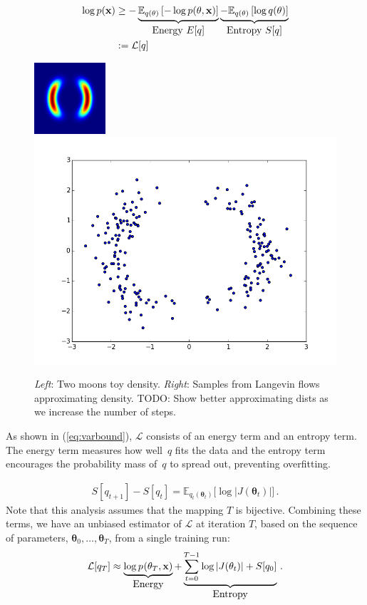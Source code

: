 \documentclass{article}
\newcommand{\vx}{\mathbf{x}}
\newcommand{\expect}{\mathbb{E}}
\newcommand{\expectargs}[2]{\mathbb{E}_{#1} \left[ {#2} \right]}
\newcommand{\varL}{\mathcal{L}}
\newcommand{\data}{\vx}
\newcommand{\params}{\mathbf{\theta}}
\newcommand{\jointdist}{p(\params , \data)}
\newcommand{\subjointdist}[2]{p_{#1}(\params_{#2} , \data)}
\begin{document}
\begin{align}
\log p(\data)
& \geq - \underbrace{\expectargs{q(\params)}{ -\log \jointdist }}_{\textnormal{\normalsize Energy $E[q]$}}
         \underbrace{- \expectargs{q(\params)}{\log  q(\params)}}_{\textnormal{\normalsize Entropy $S[q]$}} \nonumber \\
& := \varL[q] \label{eq:varbound}
\end{align}
%

\begin{figure}
\centerline{\includegraphics[height=0.34\textwidth, height=0.4\textwidth]{../montage/two_moons_density.png}
\hspace{2em}
\includegraphics[height=0.4\textwidth, height=0.4\textwidth]{../experiments/4-test-flows/2-langevin/approximating_dist.png}}
\caption{\emph{Left}: Two moons toy density.
\emph{Right}: Samples from Langevin flows approximating density.
TODO: Show better approximating dists as we increase the number of steps.}
\label{fig:toy examples}
\end{figure}

As shown in (\ref{eq:varbound}), $\varL$ consists of an energy term and an entropy term.
The energy term measures how well~$q$ fits the data and the entropy term encourages the probability mass of~$q$ to spread out, preventing overfitting.

%
\begin{align}
S[q_{t+1}] - S[q_t] =
  \expect_{q_t(\params_t)} \big[ \log
    \left| J(\params_t) \right| \big] \,.
\end{align}
%
Note that this analysis assumes that the mapping $T$ is bijective.
Combining these terms, we have an unbiased estimator of $\varL$ at iteration $T$,
based on the sequence of parameters, $\params_0, \ldots, \params_T$, from a single training run:
\begin{align}
\varL[q_T] \approx
  \underbrace{\log \subjointdist{}{T}}_{\textnormal{\normalsize Energy}} +
  \underbrace{\sum_{t=0}^{T-1} \log \left| J(\params_t) \right| + S[q_0]}_{\textnormal{\normalsize Entropy}} \,.
\label{eq:entropy-bound}
\end{align}
\end{document}
